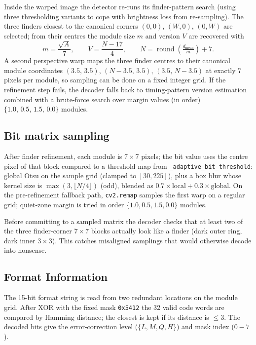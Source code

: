 \documentclass[11pt,a4paper]{article}
\begin{document}
Inside the warped image the detector re-runs its finder-pattern search
(using three thresholding variants to cope with brightness loss from
re-sampling). The three finders closest to the canonical corners
$(0,0)$, $(W,0)$, $(0,W)$ are selected; from their centres the module
size $m$ and version $V$ are recovered with
\[
m = \frac{\sqrt{A}}{7}, \qquad
V = \frac{N - 17}{4}, \qquad
N = \operatorname{round}\!\left(\tfrac{d_{\text{mean}}}{m}\right) + 7 .
\]
A second perspective warp maps the three finder centres to their
canonical module coordinates
$(3.5,\,3.5)$, $(N-3.5,\,3.5)$, $(3.5,\,N-3.5)$ at exactly $7$ pixels
per module, so sampling can be done on a fixed integer grid. If the
refinement step fails, the decoder falls back to timing-pattern version
estimation combined with a brute-force search over margin values
(in order) $\{1.0,\,0.5,\,1.5,\,0.0\}$ modules.

\subsection{Bit matrix sampling}

After finder refinement, each module is $7\times7$ pixels; the bit value
uses the centre pixel of that block compared to a threshold map from
\texttt{\_adaptive\_bit\_threshold}: global Otsu on the sample grid (clamped
to $[30,225]$), plus a box blur whose kernel size is
$\max(3,\lfloor N/4\rfloor)$ (odd), blended as $0.7\times\text{local} +
0.3\times\text{global}$. On the pre-refinement fallback path,
\texttt{cv2.remap} samples the first warp on a regular grid; quiet-zone
margin is tried in order $\{1.0, 0.5, 1.5, 0.0\}$ modules.

Before committing to a sampled matrix the decoder checks that at least
two of the three finder-corner $7\times7$ blocks actually look like a
finder (dark outer ring, dark inner $3\times3$). This catches
misaligned samplings that would otherwise decode into nonsense.

\subsection{Format Information}

The 15-bit format string is read from two redundant locations on the
module grid. After XOR with the fixed mask \texttt{0x5412} the 32 valid
code words are compared by Hamming distance; the closest is kept if
its distance is $\le 3$. The decoded bits give the error-correction
level ($\{L, M, Q, H\}$) and mask index ($0{-}7$).
\end{document}
